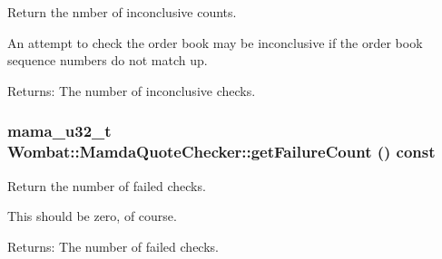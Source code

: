 Return the nmber of inconclusive counts. 

An attempt to check the order book may be inconclusive if the order book sequence numbers do not match up.

\begin{Desc}
\item[Returns:]The number of inconclusive checks. \end{Desc}
\hypertarget{classWombat_1_1MamdaQuoteChecker_5a09592269398e1bbf7b0fc4ee2b6276}{
\subsubsection[getFailureCount]{\setlength{\rightskip}{0pt plus 5cm}mama\_\-u32\_\-t Wombat::Mamda\-Quote\-Checker::get\-Failure\-Count () const}}
\label{classWombat_1_1MamdaQuoteChecker_5a09592269398e1bbf7b0fc4ee2b6276}


Return the number of failed checks. 

This should be zero, of course.

\begin{Desc}
\item[Returns:]The number of failed checks. \end{Desc}
